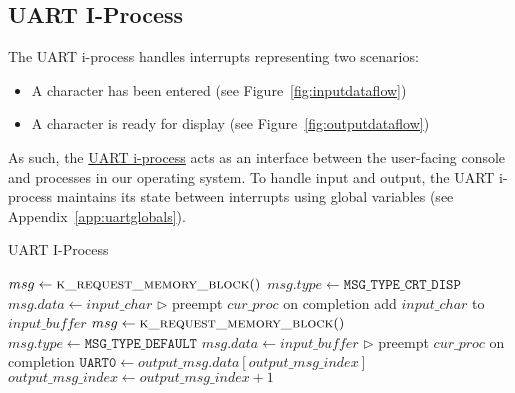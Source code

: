 \documentclass[12pt]{report}
\begin{document}
\subsection{UART I-Process}
\label{subsec:UART I-Process}

The UART i-process handles interrupts representing two scenarios:

\begin{itemize}

\item A character has been entered (see Figure~\ref{fig:inputdataflow})
\item A character is ready for display (see Figure~\ref{fig:outputdataflow})

\end{itemize}

As such, the \hyperref[alg:uartiprocess]{UART i-process} acts as an interface between the user-facing console and processes in our operating system. To handle input and output, the UART i-process maintains its state between interrupts using global variables (see Appendix~\ref{app:uartglobals}).

\begin{algorithm}
\caption{UART I-Process}
\label{alg:uartiprocess}
\begin{algorithmic}[1]
         
            \State $msg \leftarrow \Call{k\_request\_memory\_block}{\null}$
            \State $msg.type \leftarrow \texttt{MSG_TYPE_CRT_DISP}$
            \State $msg.data \leftarrow input\_char$
            \State {}
            \State $\triangleright$ preempt $cur\_proc$ on completion
        \EndIf
                \State add $input\_char$ to $\mathit{input\_buffer}$
            \Else
                \State $msg \leftarrow \Call{k\_request\_memory\_block}{\null}$
                \State $msg.type \leftarrow \texttt{MSG_TYPE_DEFAULT}$
                \State $msg.data \leftarrow \mathit{input\_buffer}$
                \State {} 
                \State $\triangleright$ preempt $cur\_proc$ on completion
            \EndIf
        \State $\texttt{UART0} \leftarrow output\_msg.data[output\_msg\_index]$
        \State $output\_msg\_index \leftarrow output\_msg\_index + 1$
    \EndIf
\EndProcedure
\end{algorithmic}
\end{algorithm}
\end{document}
